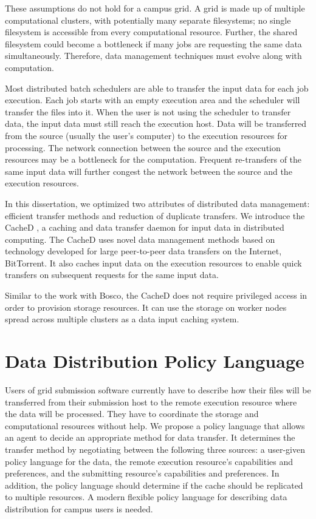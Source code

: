 These assumptions do not hold for a campus grid.  A grid is made up of multiple computational clusters, with potentially many separate filesystems; no single filesystem is accessible from every computational resource.  Further, the shared filesystem could become a bottleneck if many jobs are requesting the same data simultaneously.  Therefore, data management techniques must evolve along with computation.  


Most distributed batch schedulers are able to transfer the input data for each job execution.  Each job starts with an empty execution area and the scheduler will transfer the files into it.  When the user is not using the scheduler to transfer data, the input data must still reach the execution host.  Data will be transferred from the source (usually the user's computer) to the execution resources for processing.  The network connection between the source and the execution resources may be a bottleneck for the computation.  Frequent re-transfers of the same input data will further congest the network between the source and the execution resources.

In this dissertation, we optimized two attributes of distributed data management: efficient transfer methods and reduction of duplicate transfers.  We introduce the CacheD \cite{weitzel2015pdpta}, a caching and data transfer daemon for input data in distributed computing.  The CacheD uses novel data management methods based on technology developed for large peer-to-peer data transfers on the Internet, BitTorrent.  It also caches input data on the execution resources to enable quick transfers on subsequent requests for the same input data.

Similar to the work with Bosco, the CacheD does not require privileged access in order to provision storage resources.  It can use the storage on worker nodes spread across multiple clusters as a data input caching system.

\section{Data Distribution Policy Language}

Users of grid submission software currently have to describe how their files will be transferred from their submission host to the remote execution resource where the data will be processed.  They have to coordinate the storage and computational resources without help.  We propose a policy language that allows an agent to decide an appropriate method for data transfer.  It determines the transfer method by negotiating between the following three sources: a user-given policy language for the data, the remote execution resource's capabilities and preferences, and the submitting resource's capabilities and preferences.  In addition, the policy language should determine if the cache should be replicated to multiple resources.  A modern flexible policy language for describing data distribution for campus users is needed.

